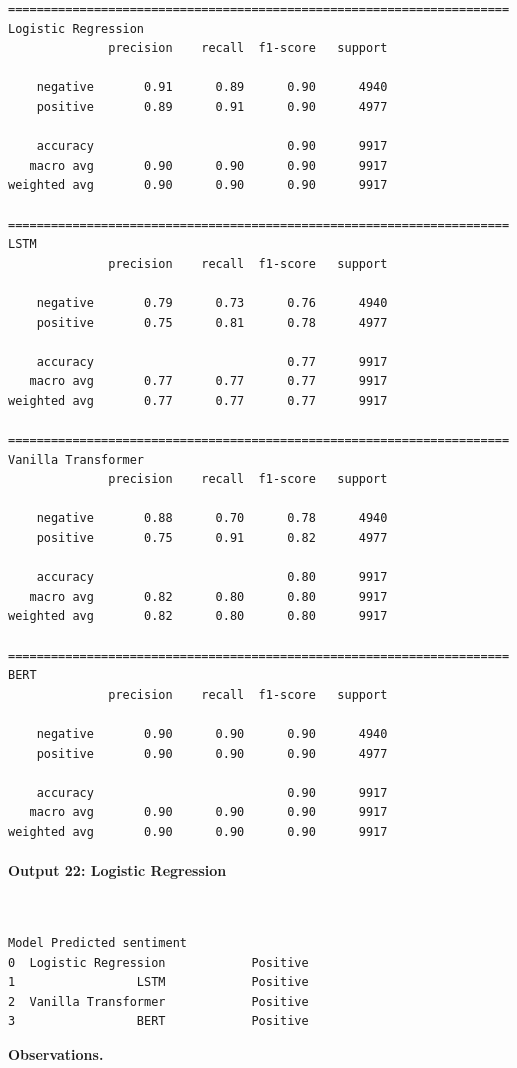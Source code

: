 \documentclass[12pt,a4paper,oneside]{report}
\begin{document}
\begin{Verbatim}[commandchars=\\\{\},breaklines=true,breakanywhere=true,fontsize=\scriptsize,frame=leftline,framesep=2mm,rulecolor=\color{gray}]
======================================================================
Logistic Regression
              precision    recall  f1-score   support

    negative       0.91      0.89      0.90      4940
    positive       0.89      0.91      0.90      4977

    accuracy                           0.90      9917
   macro avg       0.90      0.90      0.90      9917
weighted avg       0.90      0.90      0.90      9917

======================================================================
LSTM
              precision    recall  f1-score   support

    negative       0.79      0.73      0.76      4940
    positive       0.75      0.81      0.78      4977

    accuracy                           0.77      9917
   macro avg       0.77      0.77      0.77      9917
weighted avg       0.77      0.77      0.77      9917

======================================================================
Vanilla Transformer
              precision    recall  f1-score   support

    negative       0.88      0.70      0.78      4940
    positive       0.75      0.91      0.82      4977

    accuracy                           0.80      9917
   macro avg       0.82      0.80      0.80      9917
weighted avg       0.82      0.80      0.80      9917

======================================================================
BERT
              precision    recall  f1-score   support

    negative       0.90      0.90      0.90      4940
    positive       0.90      0.90      0.90      4977

    accuracy                           0.90      9917
   macro avg       0.90      0.90      0.90      9917
weighted avg       0.90      0.90      0.90      9917
\end{Verbatim}
\paragraph{Output 22: Logistic Regression}\mbox{}\\[-1ex]
\begin{Verbatim}[commandchars=\\\{\},breaklines=true,breakanywhere=true,fontsize=\scriptsize,frame=leftline,framesep=2mm,rulecolor=\color{gray}]
                 Model Predicted sentiment
0  Logistic Regression            Positive
1                 LSTM            Positive
2  Vanilla Transformer            Positive
3                 BERT            Positive
\end{Verbatim}
\textbf{Observations.}
\end{document}
